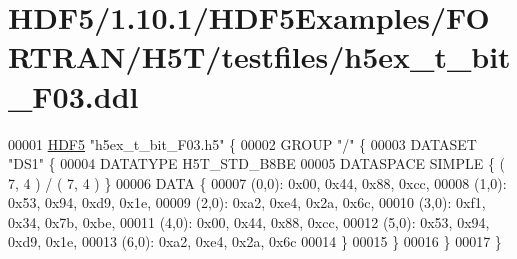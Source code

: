\hypertarget{_h_d_f5_21_810_81_2_h_d_f5_examples_2_f_o_r_t_r_a_n_2_h5_t_2testfiles_2h5ex__t__bit___f03_8ddl_source}{}\section{H\+D\+F5/1.10.1/\+H\+D\+F5\+Examples/\+F\+O\+R\+T\+R\+A\+N/\+H5\+T/testfiles/h5ex\+\_\+t\+\_\+bit\+\_\+\+F03.ddl}
\label{_h_d_f5_21_810_81_2_h_d_f5_examples_2_f_o_r_t_r_a_n_2_h5_t_2testfiles_2h5ex__t__bit___f03_8ddl_source}

\begin{DoxyCode}
00001 \hyperlink{namespace_h_d_f5}{HDF5} \textcolor{stringliteral}{"h5ex\_t\_bit\_F03.h5"} \{
00002 GROUP \textcolor{stringliteral}{"/"} \{
00003    DATASET \textcolor{stringliteral}{"DS1"} \{
00004       DATATYPE  H5T\_STD\_B8BE
00005       DATASPACE  SIMPLE \{ ( 7, 4 ) / ( 7, 4 ) \}
00006       DATA \{
00007       (0,0): 0x00, 0x44, 0x88, 0xcc,
00008       (1,0): 0x53, 0x94, 0xd9, 0x1e,
00009       (2,0): 0xa2, 0xe4, 0x2a, 0x6c,
00010       (3,0): 0xf1, 0x34, 0x7b, 0xbe,
00011       (4,0): 0x00, 0x44, 0x88, 0xcc,
00012       (5,0): 0x53, 0x94, 0xd9, 0x1e,
00013       (6,0): 0xa2, 0xe4, 0x2a, 0x6c
00014       \}
00015    \}
00016 \}
00017 \}
\end{DoxyCode}
